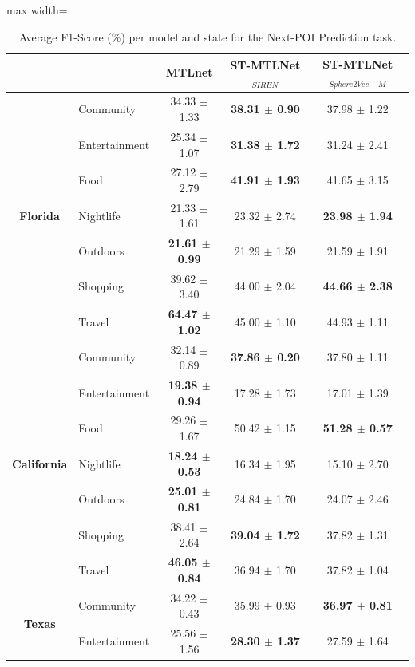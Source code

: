 \begin{table}[htbp]
\centering
\caption{Average F1-Score (\%) per model and state for the Next-POI Prediction task.}
\label{tab:courb:next}
\begin{adjustbox}{max width=\textwidth}
\begin{tabular}{clccc}
\toprule
 & & \textbf{MTLnet} & \textbf{ST-MTLNet$_{SIREN}$} & \textbf{ST-MTLNet$_{Sphere2Vec-M}$} \\
\midrule
\multirow{7}{*}{\textbf{Florida}} & Community & 34.33 $\pm$ 1.33 & \textbf{38.31 $\pm$ 0.90} & 37.98 $\pm$ 1.22 \\
 & Entertainment & 25.34 $\pm$ 1.07 & \textbf{31.38 $\pm$ 1.72} & 31.24 $\pm$ 2.41 \\
 & Food & 27.12 $\pm$ 2.79 & \textbf{41.91 $\pm$ 1.93} & 41.65 $\pm$ 3.15 \\
 & Nightlife & 21.33 $\pm$ 1.61 & 23.32 $\pm$ 2.74 & \textbf{23.98 $\pm$ 1.94} \\
 & Outdoors & \textbf{21.61 $\pm$ 0.99} & 21.29 $\pm$ 1.59 & 21.59 $\pm$ 1.91 \\
 & Shopping & 39.62 $\pm$ 3.40 & 44.00 $\pm$ 2.04 & \textbf{44.66 $\pm$ 2.38} \\
 & Travel & \textbf{64.47 $\pm$ 1.02} & 45.00 $\pm$ 1.10 & 44.93 $\pm$ 1.11 \\
\midrule
\multirow{7}{*}{\textbf{California}} & Community & 32.14 $\pm$ 0.89 & \textbf{37.86 $\pm$ 0.20} & 37.80 $\pm$ 1.11 \\
 & Entertainment & \textbf{19.38 $\pm$ 0.94} & 17.28 $\pm$ 1.73 & 17.01 $\pm$ 1.39 \\
 & Food & 29.26 $\pm$ 1.67 & 50.42 $\pm$ 1.15 & \textbf{51.28 $\pm$ 0.57} \\
 & Nightlife & \textbf{18.24 $\pm$ 0.53} & 16.34 $\pm$ 1.95 & 15.10 $\pm$ 2.70 \\
 & Outdoors & \textbf{25.01 $\pm$ 0.81} & 24.84 $\pm$ 1.70 & 24.07 $\pm$ 2.46 \\
 & Shopping & 38.41 $\pm$ 2.64 & \textbf{39.04 $\pm$ 1.72} & 37.82 $\pm$ 1.31 \\
 & Travel & \textbf{46.05 $\pm$ 0.84} & 36.94 $\pm$ 1.70 & 37.82 $\pm$ 1.04 \\
\midrule
\multirow{7}{*}{\textbf{Texas}} & Community & 34.22 $\pm$ 0.43 & 35.99 $\pm$ 0.93 & \textbf{36.97 $\pm$ 0.81} \\
 & Entertainment & 25.56 $\pm$ 1.56 & \textbf{28.30 $\pm$ 1.37} & 27.59 $\pm$ 1.64 \\

\end{tabular}
\end{adjustbox}
\end{table}
